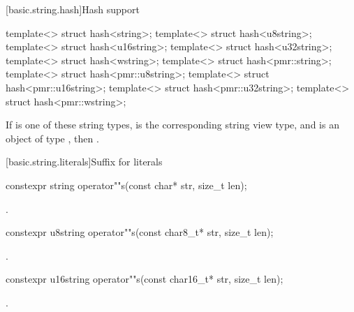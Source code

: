 [basic.string.hash]{Hash support}

%
%
%
%
%
%
%
%
\begin{itemdecl}
template<> struct hash<string>;
template<> struct hash<u8string>;
template<> struct hash<u16string>;
template<> struct hash<u32string>;
template<> struct hash<wstring>;
template<> struct hash<pmr::string>;
template<> struct hash<pmr::u8string>;
template<> struct hash<pmr::u16string>;
template<> struct hash<pmr::u32string>;
template<> struct hash<pmr::wstring>;
\end{itemdecl}

\begin{itemdescr}
\pnum
If  is one of these string types,
 is the corresponding string view type, and
 is an object of type ,
then .
\end{itemdescr}

[basic.string.literals]{Suffix for  literals}

%
\begin{itemdecl}
constexpr string operator""s(const char* str, size_t len);
\end{itemdecl}

\begin{itemdescr}
\pnum
\returns
{}.
\end{itemdescr}

%
\begin{itemdecl}
constexpr u8string operator""s(const char8_t* str, size_t len);
\end{itemdecl}
\begin{itemdescr}
\pnum
\returns
{}.
\end{itemdescr}

%
\begin{itemdecl}
constexpr u16string operator""s(const char16_t* str, size_t len);
\end{itemdecl}
\begin{itemdescr}
\pnum
\returns
{}.
\end{itemdescr}

